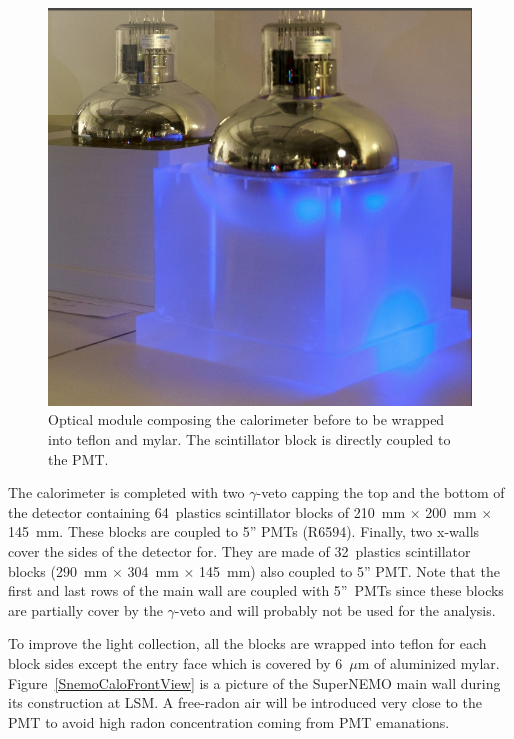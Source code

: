 \documentclass[main.tex]{subfiles}
\begin{document}
\begin{figure}[h!]
\begin{center}
\includegraphics[scale=0.25]{pictures/Chap3/calo_1.png}
\caption{Optical module composing the calorimeter before to be wrapped into teflon and mylar. The scintillator block is directly coupled to the PMT.}
\label{SnemoOpticalModule}
\end{center}
\end{figure}



\NI The calorimeter is completed with two $\gamma$-veto capping the top and the bottom of the detector containing 64~plastics scintillator blocks of 210~mm $\times$ 200~mm $\times$ 145~mm. These blocks are coupled to 5'' PMTs (R6594). Finally, two x-walls cover the sides of the detector for. They are made of 32~plastics scintillator blocks (290~mm $\times$ 304~mm $\times$ 145~mm) also coupled to 5'' PMT. Note that the first and last rows of the main wall are coupled with 5''~PMTs since these blocks are partially cover by the $\gamma$-veto and will probably not be used for the analysis.

\bigskip


\NI To improve the light collection, all the blocks are wrapped into teflon for each block sides except the entry face which is covered by 6~$\mu$m of aluminized mylar. Figure~\ref{SnemoCaloFrontView} is a picture of the SuperNEMO main wall during its construction at LSM. A free-radon air will be introduced very close to the PMT to avoid high radon concentration coming from PMT emanations.
\end{document}
